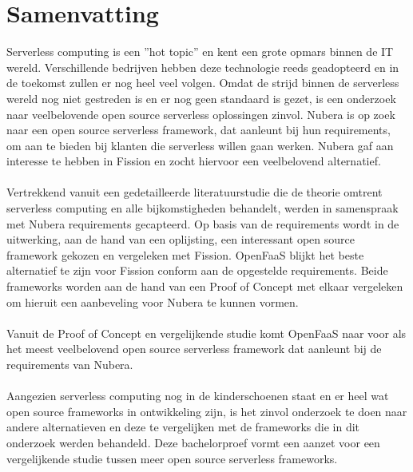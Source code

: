 \chapter*{Samenvatting}
Serverless computing is een ''hot topic'' en kent een grote opmars binnen de IT wereld. Verschillende bedrijven hebben deze technologie reeds geadopteerd en in de toekomst zullen er nog heel veel volgen. Omdat de strijd binnen de serverless wereld nog niet gestreden is en er nog geen standaard is gezet, is een onderzoek naar veelbelovende open source serverless oplossingen zinvol. Nubera is op zoek naar een open source serverless framework, dat aanleunt bij hun requirements, om aan te bieden bij klanten die serverless willen gaan werken. Nubera gaf aan interesse te hebben in Fission en zocht hiervoor een veelbelovend alternatief. 
\\\\
Vertrekkend vanuit een gedetailleerde literatuurstudie die de theorie omtrent serverless computing en alle bijkomstigheden behandelt, werden in samenspraak met Nubera requirements gecapteerd. Op basis van de requirements wordt in de uitwerking, aan de hand van een oplijsting, een interessant open source framework gekozen en vergeleken met Fission. OpenFaaS blijkt het beste alternatief te zijn voor Fission conform aan de opgestelde requirements. Beide frameworks worden aan de hand van een Proof of Concept met elkaar vergeleken om hieruit een aanbeveling voor Nubera te kunnen vormen. 
\\\\
Vanuit de Proof of Concept en vergelijkende studie komt OpenFaaS naar voor als het meest veelbelovend open source serverless framework dat aanleunt bij de requirements van Nubera.
\\\\
Aangezien serverless computing nog in de kinderschoenen staat en er heel wat open source frameworks in ontwikkeling zijn, is het zinvol onderzoek te doen naar andere alternatieven en deze te vergelijken met de frameworks die in dit onderzoek werden behandeld. Deze bachelorproef vormt een aanzet voor een vergelijkende studie tussen meer open source serverless frameworks.
